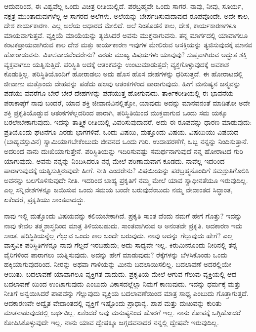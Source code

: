 ಆದುದರಿಂದ, ಈ ವಿಶ್ವವೆಲ್ಲ ಒಂದು ವಿಚಿತ್ರ ರೀತಿಯಲ್ಲಿದೆ. ಪರಬ್ರಹ್ಮವೇ ಒಂದು ಸಾಗರ. ನಾವು, ನೀವು, ಸೂರ್ಯ, ನಕ್ಷತ್ರ ಮುಂತಾದುವುಗಳೆಲ್ಲ ಆ ಸಾಗರದ ಅಲೆಗಳು. ಅಲೆಯನ್ನು ಬೇರ್ಪಡಿಸುವುದಾವುದ ರೂಪವೊಂದೇ. ಅದೇ ಕಾಲ, ದೇಶ ಕಾರ್ಯಕಾರಣ. ಎಲ್ಲ ಅಲೆಯ ಆಧಾರದ ಮೇಲಿದೆ. ಅಲೆ ನಿಂತೊಡನೆ ಕಾಲ, ದೇಶ, ಕಾರ್ಯಕಾರಣಗಳೂ ಮಾಯವಾಗುತ್ತವೆ. ವ್ಯಕ್ತಿಯೆ ಮಾಯೆಯನ್ನು ತ್ಯಜಿಸಿದರೆ ಅವನು ಮುಕ್ತನಾಗುವನು. ತನ್ನ ಮಾರ್ಗದಲ್ಲಿ ಯಾವಾಗಲೂ ಕಂಟಕಪ್ರಾಯವಾಗಿರುವ ಕಾಲ ದೇಶ ಮತ್ತು ಕಾರ್ಯಕಾರಣ ಇವುಗಳ ಮೇಲಿರುವ ಆಸಕ್ತಿಯನ್ನು ತ್ಯಜಿಸುವುದಕ್ಕೆ ಮಾನವ ಹೋರಾಡುವನು. ವಿಕಾಸವಾದವೆಂದರೇನು? ಎರಡು ಮುಖ್ಯ ವಿಷಯಗಳು ಯಾವುವು? ಸುಪ್ತವಾಗಿರುವ ಅದ್ಭುತ ಶಕ್ತಿ ವ್ಯಕ್ತವಾಗಲು ಯತ್ನಿಸುತ್ತಿದೆ. ಪರಿಸ್ಥಿತಿ ಅದಕ್ಕೆ ಆತಂಕವನ್ನು ಉಂಟುಮಾಡುತ್ತದೆ; ವ್ಯಕ್ತಗೊಳ್ಳುವುದಕ್ಕೆ ಅವಕಾಶ ಕೊಡುತ್ತಿಲ್ಲ. ಪರಿಸ್ಥಿತಿಯೊಂದಿಗೆ ಹೋರಾಡಲು ಅದು ಹೊಸ ಹೊಸ ದೇಹಗಳನ್ನು ಧರಿಸುತ್ತದೆ. ಈ ಹೋರಾಟದಲ್ಲಿ ಜೀವಾಣು ಮತ್ತೊಂದು ದೇಹವನ್ನು ಪಡೆದು ಹಲವು ಆತಂಕಗಳಿಂದ ಪಾರಾಗುವುದು. ಹೀಗೆ ಮನುಷ್ಯನ ಜನ್ಮವನ್ನು ಪಡೆಯು ವವರೆಗೂ ಬೇರೆ ಬೇರೆ ದೇಹಗಳನ್ನು ಪಡೆಯುತ್ತ ಹೋಗುವುದು. ತಾರ್ಕಿಕರೀತಿಯಲ್ಲಿ ಈ ಭಾವನೆಯ ಪರಾಕಾಷ್ಠೆಗೆ ನಾವು ಬಂದರೆ, ಯಾವ ಶಕ್ತಿ ಜೀವಾಣಿವಿನಲ್ಲಿತ್ತೋ, ಯಾವುದು ಅದನ್ನು ಮಾನವನಂತೆ ಮಾಡಿತೋ ಅದೇ ಶಕ್ತಿ ಪ್ರಕೃತಿಯೊಡ್ಡುವ ಆತಂಕಗಳೆಲ್ಲದರಿಂದ ಪಾರಾಗಿ, ಪರಿಸ್ಥಿತಿಯಿಂದ ಮುಕ್ತವಾಗುವ ಒಂದು ಸಮ ಯಕ್ಕೂ ಬರಲೇಬೇಕಾಗುವುದು. ಇದನ್ನು ತಾತ್ತ್ವಿಕ ರೀತಿಯಲ್ಲಿ ವಿವರಿಸುವುದಾದರೆ, ಅದು ಈ ರೂಪವನ್ನು ಧಾರಣ ಮಾಡುವುದು: ಪ್ರತಿಯೊಂದು ಘಟನೆಗೂ ಎರಡು ಭಾಗಗಳಿವೆ. ಒಂದು ವಿಷಯಿ, ಮತ್ತೊಂದು ವಿಷಯ. ವಿಷಯಿಯು ವಿಷಯದ (ಬಾಹ್ಯವಸ್ತುವಿನ) ಸ್ವಾಮಿಯಾಗಬೇಕೆಂಬುದು ಜೀವನದ ಒಂದು ಗುರಿ. ಉದಾಹರಣೆಗೆ, ಒಬ್ಬ ನನ್ನನ್ನು ನಿಂದಿಸುತ್ತಾನೆ. ಅದರಿಂದ ನಾನು ದುಃಖಿಯಾಗುತ್ತೇನೆ. ಪರಿಸ್ಥಿತಿಯನ್ನು ಇದಿರಿಸುವಷ್ಟು ಸಮರ್ಥನಾಗುವುದೆ ನನ್ನ ಹೋರಾಟದ ಗುರಿ ಯಾಗುವುದು. ಅವನು ನನ್ನನ್ನು ನಿಂದಿಸಿದರೂ ನನ್ನ ಮೇಲೆ ಪರಿಣಾಮವಾಗ ಕೂಡದು. ನಾವೆಲ್ಲ ಇದರಿಂದ ಪಾರಾಗುವುದಕ್ಕೆ ಯತ್ನಿಸುತ್ತಿರುವುದೇ ಹೀಗೆ. ನೀತಿ ಎಂದರೇನು? ವಿಷಯಿಯನ್ನು ಪರಬ್ರಹ್ಮನೊಂದಿಗೆ ಸಮಶ್ರುತಿಗೊಲಿಸಿ ಅವನನ್ನು ಬಲಗೊಳಿಸುವುದೇ ನೀತಿ. ಇದರಿಂದ ಬಾಹ್ಯ ಪ್ರಕೃತಿಗೆ ನಮ್ಮ ಮೇಲೆ ಯಾವ ಸ್ವಾಧೀನತೆಯೂ ಇರುವುದಿಲ್ಲ. ಎಲ್ಲ ಸನ್ನಿವೇಶಗಳನ್ನೂ ಜಯಿಸುವ ಒಂದು ಸಮಯ ಬಂದೇ ಬರುವುದೆಂಬುದು ನಮ್ಮ ವೇದಾಂತದ ಸಿದ್ಧಾಂತ, ಏಕೆಂದರೆ, ಪ್ರಕೃತಿಯು ಸಾಂತವಾದದ್ದು.

ನಾವು ಇಲ್ಲಿ ಮತ್ತೊಂದು ವಿಷಯವನ್ನು ಕಲಿಯಬೇಕಾಗಿದೆ. ಪ್ರಕೃತಿ ಸಾಂತ ವೆಂದು ನಮಗೆ ಹೇಗೆ ಗೊತ್ತು? ಇದನ್ನು ನಾವು ಕೇವಲ ತತ್ತ್ವಶಾಸ್ತ್ರದಿಂದ ಮಾತ್ರ ತಿಳಿಯಬಹುದು. ಸಾಂತವಾಗಿರುವ ಆ ಅನಂತವೇ ಪ್ರಕೃತಿ. ಆದಕಾರಣ ಇದು ಸಾಂತ. ಪರಿಸ್ಥಿತಿಯನ್ನೆಲ್ಲ ಗೆಲ್ಲುವ ಒಂದು ಕಾಲ ಬಂದೇ ಬರುವುದು. ನಾವು ಅದನ್ನು ಗೆಲ್ಲುವುದು ಹೇಗೆ? ಎಲ್ಲ ವಾಸ್ತವಿಕ ಪರಿಸ್ಥಿತಿಗಳನ್ನೂ ನಾವು ಗೆಲ್ಲದೆ ಇರಬಹುದು; ಅದು ಸಾಧ್ಯವೇ ಇಲ್ಲ. ಕಿರುಮೀನೊಂದು ನೀರಿನಲ್ಲಿ ತನ್ನ ವೈರಿಗಳಿಂದ ಪಾರಾಗಲು ಯತ್ನಿಸುವುದು. ಅದನ್ನು ಹೇಗೆ ಮಾಡುವುದು? ರೆಕ್ಕೆಗಳನ್ನು ಬೆಳಸಿಕೊಂಡು ಒಂದು ಹಕ್ಕಿಯಾಗುವುದರಿಂದ. ನೀರನ್ನು ಅಥವಾ ಗಾಳಿಯನ್ನು ಮೀನು ಬದಲಾಯಿಸಲಿಲ್ಲ. ಬದಲಾವಣೆ ಅದರಲ್ಲಿಯೇ ಆಯಿತು. ಬದಲಾವಣೆ ಯಾವಾಗಲೂ ವ್ಯಕ್ತಿಗತ ವಾದುದು. ಪ್ರಕೃತಿಯ ಮೇಲೆ ಆಗುವ ಗೆಲುವು ವ್ಯಕ್ತಿಯಲ್ಲಿ ಆದ ಬದಲಾವಣೆ ಯಿಂದ ಉಂಟಾಗುವುದು ಎಂಬುದು ವಿಕಾಸದಲ್ಲೆಲ್ಲಾ ನಿಮಗೆ ಕಾಣುವುದು. ಇದನ್ನು ಧರ್ಮಕ್ಕೆ ಮತ್ತು ನೀತಿಗೆ ಅನ್ವಯಿಸಿದರೆ ಪಾಪವನ್ನು ಗೆಲ್ಲುವುದು ವ್ಯಕ್ತಿಯ ಬದಲಾವಣೆಯಿಂದ ಮಾತ್ರ ಸಾಧ್ಯ ಎಂಬುದು ಗೊತ್ತಾಗುತ್ತದೆ. ಆದಕಾರಣವೇ ಅದ್ವೈತ ವೇದಾಂತದಲ್ಲಿ ವ್ಯಕ್ತಿಗೆ ಇಷ್ಟೊಂದು ಪ್ರಾಧಾನ್ಯ. ಪಾಪ ಮತ್ತು ದುಃಖವನ್ನು ಕುರಿತು ಮಾತನಾಡುವುದರಲ್ಲಿ ಅರ್ಥವಿಲ್ಲ. ಏಕೆಂದರೆ ಅವು ಮನುಷ್ಯನಿಂದ ಹೊರಗೆ ಇಲ್ಲ. ನಾನು ಕೋಪಕ್ಕೆ ಒಗ್ಗಿಹೋದರೆ ಕೋಪಿಸಿಕೊಳ್ಳುವುದೇ ಇಲ್ಲ. ನಾನು ಯಾವ ದ್ವೇಷಕ್ಕೂ ಜಗ್ಗದವನಾದರೆ ನನ್ನಲ್ಲಿ ದ್ವೇಷವೇ ಇರುವುದಿಲ್ಲ.

